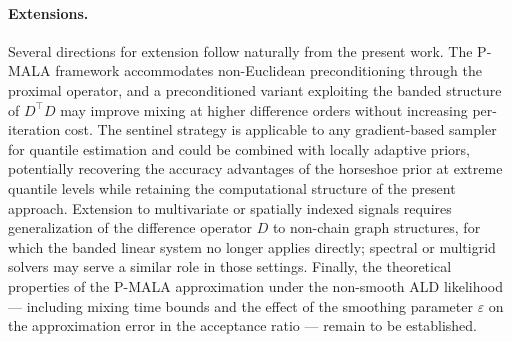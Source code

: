 \paragraph{Extensions.}
Several directions for extension follow naturally from the present work. The P-MALA framework accommodates non-Euclidean preconditioning through the proximal operator, and a preconditioned variant exploiting the banded structure of $D^\top D$ may improve mixing at higher difference orders without increasing per-iteration cost. The sentinel strategy is applicable to any gradient-based sampler for quantile estimation and could be combined with locally adaptive priors, potentially recovering the accuracy advantages of the horseshoe prior at extreme quantile levels while retaining the computational structure of the present approach. Extension to multivariate or spatially indexed signals requires generalization of the difference operator $D$ to non-chain graph structures, for which the banded linear system no longer applies directly; spectral or multigrid solvers may serve a similar role in those settings. Finally, the theoretical properties of the P-MALA approximation under the non-smooth ALD likelihood --- including mixing time bounds and the effect of the smoothing parameter $\varepsilon$ on the approximation error in the acceptance ratio --- remain to be established.
